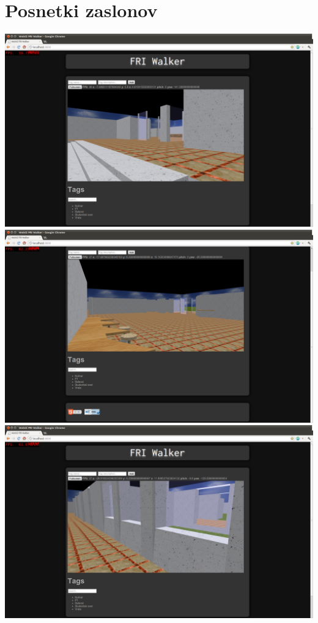 \documentclass[10pt,a4paper]{article}
\begin{document}
\section{Posnetki zaslonov}
\includegraphics[scale=0.3]{screen1.png}\\
\includegraphics[scale=0.3]{screen2.png}\\
\includegraphics[scale=0.3]{screen3.png}\\
\end{document}
